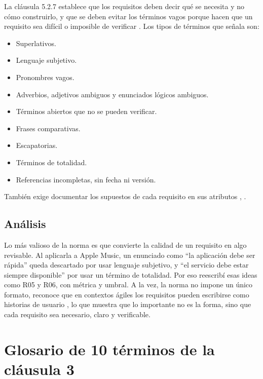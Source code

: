 \documentclass[conference,onecolumn]{IEEEtran}
\begin{document}
La cláusula 5.2.7 establece que los requisitos deben decir qué se necesita y no cómo construirlo, y que se deben evitar los términos vagos porque hacen que un requisito sea difícil o imposible de verificar \cite[\nopp cl.~5.2.7]{ieee29148}. Los tipos de términos que señala son:

\begin{itemize}
\item Superlativos.
\item Lenguaje subjetivo.
\item Pronombres vagos.
\item Adverbios, adjetivos ambiguos y enunciados lógicos ambiguos.
\item Términos abiertos que no se pueden verificar.
\item Frases comparativas.
\item Escapatorias.
\item Términos de totalidad.
\item Referencias incompletas, sin fecha ni versión.
\end{itemize}

También exige documentar los supuestos de cada requisito en sus atributos \cite[\nopp cl.~5.2.7]{ieee29148}, \cite[\nopp cl.~5.2.8]{ieee29148}.

\subsection{Análisis}

Lo más valioso de la norma es que convierte la calidad de un requisito en algo revisable. Al aplicarla a Apple Music, un enunciado como “la aplicación debe ser rápida” queda descartado por usar lenguaje subjetivo, y “el servicio debe estar siempre disponible” por usar un término de totalidad. Por eso reescribí esas ideas como R05 y R06, con métrica y umbral. A la vez, la norma no impone un único formato, reconoce que en contextos ágiles los requisitos pueden escribirse como historias de usuario \cite[\nopp cl.~5.2.4]{ieee29148}, lo que muestra que lo importante no es la forma, sino que cada requisito sea necesario, claro y verificable.

\section{Glosario de 10 términos de la cláusula 3}
\end{document}

